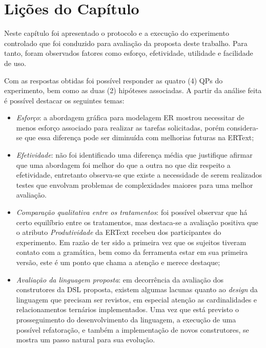 
\section{Lições do Capítulo} \label{sec:licoesExp}


Neste capítulo foi apresentado o protocolo e a execução do experimento controlado que foi conduzido para avaliação da proposta deste trabalho.
Para tanto, foram observados fatores como esforço, efetividade, utilidade e facilidade de uso.

Com as respostas obtidas foi possível responder as quatro (4) \acp{QP} do experimento, bem como as duas (2) hipóteses associadas.
A partir da análise feita é possível destacar os seguintes temas:
\begin{itemize}
    \item \textit{Esforço}: a abordagem gráfica para modelagem \ac{ER} mostrou necessitar de menos esforço associado para realizar as tarefas solicitadas, porém considera-se que essa diferença pode ser diminuída com melhorias futuras na ERText;
    \item \textit{Efetividade}: não foi identificado uma diferença média que justifique afirmar que uma abordagem foi melhor do que a outra no que diz respeito a efetividade, entretanto observa-se que existe a necessidade de serem realizados testes que envolvam problemas de complexidades maiores para uma melhor avaliação.
    \item \textit{Comparação qualitativa entre os tratamentos}: foi possível observar que há certo equilíbrio entre os tratamentos, mas destaca-se a avaliação positiva que o atributo \textit{Produtividade} da ERText recebeu dos participantes do experimento. 
    Em razão de ter sido a primeira vez que os sujeitos tiveram contato com a gramática, bem como da ferramenta estar em sua primeira versão, este é um ponto que chama a atenção e merece destaque;
    \item \textit{Avaliação da linguagem proposta}: em decorrência da avaliação dos construtores da \ac{DSL} proposta, existem algumas lacunas quanto ao \textit{design} da linguagem que precisam ser revistos, em especial atenção as cardinalidades e relacionamentos ternários implementados.
    Uma vez que está previsto o prosseguimento do desenvolvimento da linguagem, a execução de uma possível refatoração, e também a implementação de novos construtores, se mostra um passo natural para sua evolução.
\end{itemize}



